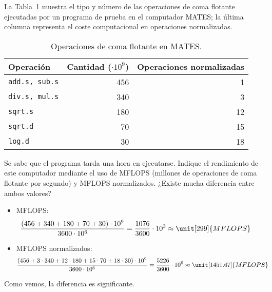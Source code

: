 \begin{ejercicio}\label{ej:4.2}
La Tabla~\ref{tab:ej:4.2} muestra el tipo y número de las operaciones de coma flotante ejecutadas por un programa de prueba en el computador MATES; la última columna representa el coste computacional en operaciones normalizadas.
\begin{table}[h]
\centering
\begin{tabular}{@{}lrr@{}}
\toprule
Operación & Cantidad ($\cdot 10^9$) & Operaciones normalizadas \\ \midrule
\verb|add.s, sub.s| & 456 & 1 \\
\verb|div.s, mul.s| & 340 & 3 \\
\verb|sqrt.s| & 180 & 12 \\
\verb|sqrt.d| & 70 & 15 \\
\verb|log.d| & 30 & 18 \\ \bottomrule
\end{tabular}
\caption{Operaciones de coma flotante en MATES.}
\label{tab:ej:4.2}
\end{table}
Se sabe que el programa tarda una hora en ejecutarse. Indique el rendimiento de este computador mediante el uso de MFLOPS (millones de operaciones de coma flotante por segundo) y MFLOPS normalizados. ¿Existe mucha diferencia entre ambos valores?
\begin{itemize}
    \item MFLOPS:
    \begin{align*}
        \dfrac{(456 + 340 + 180 + 70 + 30)\cdot 10^9}{3600\cdot 10^6} &= \dfrac{1076}{3600}\cdot 10^3 \approx \unit[299]{MFLOPS}
    \end{align*}
    \item MFLOPS normalizados:
    \begin{align*}
        \dfrac{(456 + 3 \cdot 340 + 12 \cdot 180 + 15 \cdot 70 + 18 \cdot 30)\cdot 10^9}{3600\cdot 10^6} &= \dfrac{5226}{3600}\cdot 10^6 \approx \unit[1451.67]{MFLOPS}
    \end{align*}
\end{itemize}
Como vemos, la diferencia es significante.
\end{ejercicio}
\begin{comment}Sol:
El programa obtiene 299 MFLOPS y 1452 MFLOPS normalizados.
\end{comment}

